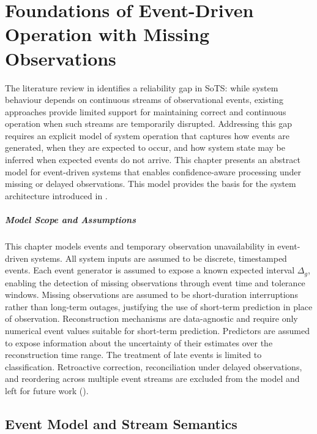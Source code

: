 \chapter{Foundations of Event-Driven Operation with Missing Observations}\label{ch:semantics}

The literature review in  identifies a reliability gap in SoTS: while system behaviour depends on continuous streams of observational events, existing approaches provide limited support for maintaining correct and continuous operation when such streams are temporarily disrupted.
Addressing this gap requires an explicit model of system operation that captures how events are generated, when they are expected to occur, and how system state may be inferred when expected events do not arrive.
This chapter presents an abstract model for event-driven systems that enables confidence-aware processing under missing or delayed observations. This model provides the basis for the system architecture introduced in .

\paragraph{Model Scope and Assumptions}
This chapter models events and temporary observation unavailability in event-driven systems. All system inputs are assumed to be discrete, timestamped events.
Each event generator is assumed to expose a known expected interval $\Delta_g$, enabling the detection of missing observations through event time and tolerance windows. Missing observations are assumed to be short-duration interruptions rather than long-term outages, justifying the use of short-term prediction in place of observation.
Reconstruction mechanisms are data-agnostic and require only numerical event values suitable for short-term prediction. Predictors are assumed to expose information about the uncertainty of their estimates over the reconstruction time range.
The treatment of late events is limited to classification. Retroactive correction, reconciliation under delayed observations, and reordering across multiple event streams are excluded from the model and left for future work ().



\section{Event Model and Stream Semantics}
\label{sec:events-streams}

